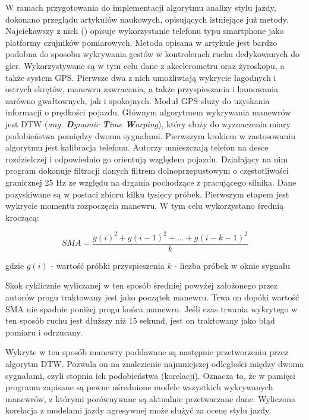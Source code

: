 W ramach przygotowania do implementacji algorytmu analizy stylu jazdy, dokonano przeglądu artykułów naukowych, opisujących istniejące już metody. Najciekawszy z nich (\cite{driving_analysis_article}) opisuje wykorzystanie telefonu typu smartphone jako platformy czujników pomiarowych. Metoda opisana w artykule jest bardzo podobna do sposobu wykrywania gestów w kontrolerach ruchu dedykowanych do gier.  Wykorzystywane są w tym celu dane z akcelerometru oraz żyroskopu, a także system GPS. Pierwsze dwa z nich umożliwiają wykrycie łagodnych i ostrych skrętów, manewru zawracania, a także przyspieszania i hamowania zarówno gwałtownych, jak i spokojnych. Moduł GPS służy do uzyskania informacji o prędkości pojazdu. Głównym algorytmem wykrywania manewrów jest DTW (\textit{ang. \textbf{D}ynamic \textbf{T}ime \textbf{W}arping}), który służy do wyznaczenia miary podobieństwa pomiędzy dwoma sygnałami. 
Pierwszym krokiem w zastosowaniu algorytmu jest kalibracja telefonu. Autorzy umieszczają telefon na desce rozdzielczej i odpowiednio go orientują względem pojazdu. Działający na nim program dokonuje filtracji danych filtrem dolnoprzepustowym o częstotliwości granicznej 25 Hz ze względu na drgania pochodzące z pracującego silnika. Dane pozyskiwane są w postaci zbioru kilku tysięcy próbek. 
Pierwszym etapem jest wykrycie momentu rozpoczęcia manewru. W tym celu wykorzystano średnią kroczącą:

\begin{equation}
	SMA = \frac{g(i)^2 + g(i-1)^2 + ... + g(i-k-1)^2}{k}
\end{equation}

gdzie
$g(i)$ - wartość próbki przyspieszenia
$k$ - liczba próbek w oknie sygnału

Skok cyklicznie wyliczanej w ten sposób średniej powyżej założonego przez autorów progu traktowany jest jako początek manewru. Trwa on dopóki wartość SMA nie spadnie poniżej progu końca manewru. Jeśli czas trwania wykrytego w ten sposób ruchu jest dłuższy niż 15 sekund, jest on traktowany jako błąd pomiaru i odrzucany.

Wykryte w ten sposób manewry poddawane są następnie przetworzeniu przez algorytm DTW. Pozwala on na znalezienie najmniejszej odległości między dwoma sygnałami, czyli stopnia ich podobieństwa (korelacji). Oznacza to, że w pamięci programu zapisane są pewne uśrednione modele wszystkich wykrywanych manewrów, z którymi porównywane są aktualnie przetwarzane dane. Wyliczona korelacja z modelami jazdy agresywnej może służyć za ocenę stylu jazdy.


